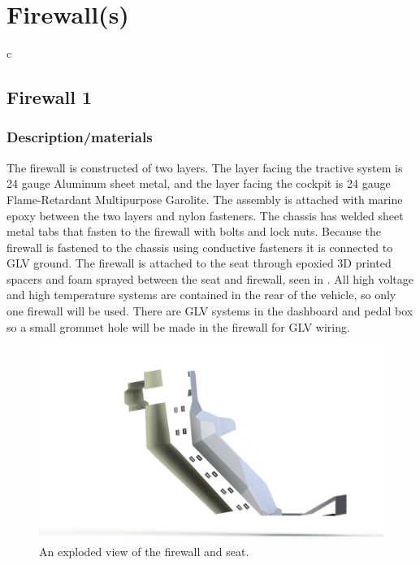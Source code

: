 \documentclass{article}
\begin{document}
\section{Firewall(s)}\label{firewalls}c
\subsection{Firewall 1}\label{firewall_1}
\subsubsection{Description/materials}
The firewall is constructed of two layers. The layer facing the tractive system is 24 gauge Aluminum sheet metal, and the layer facing the cockpit is 24 gauge Flame-Retardant Multipurpose Garolite. The assembly is attached with marine epoxy between the two layers and nylon fasteners. The chassis has welded sheet metal tabs that fasten to the firewall with bolts and lock nuts. Because the firewall is fastened to the chassis using conductive fasteners it is connected to GLV ground. The firewall is attached to the seat through epoxied 3D printed spacers and foam sprayed between the seat and firewall, seen in .
All high voltage and high temperature systems are contained in the rear of the vehicle, so only one firewall will be used. There are GLV systems in the dashboard and pedal box so a small grommet hole will be made in the firewall for GLV wiring.

\begin{figure}[H]
    \centering
    \includegraphics[width = 1 \textwidth]{firewall_exploded.png}
    \caption{An exploded view of the firewall and seat. }
    \label{fig:firewall_exploded}
\end{figure}
\end{document}
